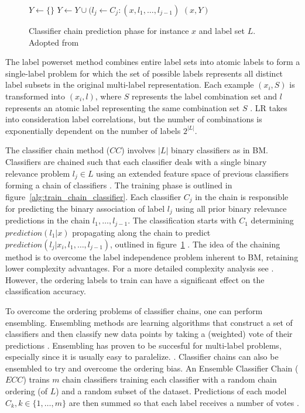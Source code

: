 \begin{figure}
\begin{algorithmic}[1]
\State $Y \gets \{\}$
  \State $Y \gets Y \cup (l_j \gets C_j: (x, l_1, \dots, l_{j - 1})$
\EndFor
\Return $(x, Y)$
\end{algorithmic}
\caption{Classifier chain prediction phase for instance $x$ 
	and label set $L$.
	Adopted from~\citep{read2011classifier}
	}
\label{alg:test_chain_classifier}
\end{figure}

The label powerset method combines entire label sets into atomic labels 
to form a single-label problem for which the set of possible labels 
represents all distinct label subsets in the original multi-label 
representation. Each example $(x_i, S)$ is transformed into 
$(x_i, l)$, where $S$ represents the label combination set and
$l$ represents an atomic label representing the same combination set $S$
\citep{read2011classifier}. LR takes into 
consideration label correlations, but the number of combinations
is exponentially dependent on the number of labels $2^{|L|}$. 

The classifier chain method ($CC$) involves $|L|$ binary classifiers as in BM. 
Classifiers are chained such that each classifier deals with 
a single binary relevance problem $l_j \in L$ using an extended feature space of 
previous classifiers 
forming a chain of classifiers \citep{read2011classifier}.
The training phase is outlined in figure~\ref{alg:train_chain_classifier}. 
Each classifier $C_j$ in the chain is responsible for predicting 
the binary association of label $l_j$ using all prior 
binary relevance predictions in the chain $l_1, \dots, l_{j - 1}$.
The classification starts with $C_1$ determining 
$prediction(l_1 | x)$ propagating along the chain
to predict $prediction(l_j | x_i, l_1, \dots, l_{j-1})$, outlined 
in figure~\ref{alg:test_chain_classifier}
\citep{read2011classifier}.
The idea of the chaining method is to overcome the label independence problem
inherent to BM, retaining lower complexity advantages. 
For a more detailed complexity analysis see \citep{read2011classifier}. 
However, the ordering labels to train can have a significant effect on 
the classification accuracy. 

To overcome the ordering problems of classifier chains, one
can perform ensembling. 
Ensembling methods are learning algorithms 
that construct a set of classifiers and then classify new data 
points by taking a (weighted) vote of their predictions \citep{dietterich2000ensemble}.
Ensembling has proven to be succesful for multi-label 
problems, especially since it is usually easy to paralelize. 
\citep{tsoumakas2007random}. Classifier chains can also be
ensembled to try and overcome the ordering bias. An Ensemble 
Classifier Chain ($ECC$) trains $m$ chain classifiers training
each classifier with a random chain ordering (of $L$) and a random
subset of the dataset. Predictions of each  model $C_k, k \in \{1, \dots, m\}$ 
are then summed so that each label receives a number of votes
\citep{dimitriadou2001voting}.


